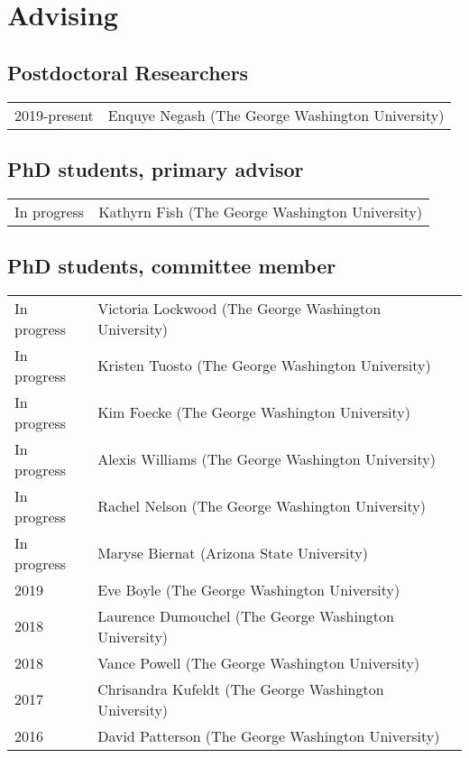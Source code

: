 \documentclass{article}
\begin{document}
\section*{Advising}
\subsection*{Postdoctoral Researchers}
\begin{tabular}{p{}p{}}
2019-present & Enquye Negash (The George Washington University)\\[4pt]
\end{tabular}

\subsection*{PhD students, primary advisor}
\begin{tabular}{p{}p{}}
In progress & Kathyrn Fish (The George Washington University)\\[4pt] %
\end{tabular}

\subsection*{PhD students, committee member}
\begin{tabular}{p{}p{}}
In progress & Victoria Lockwood (The George Washington University)\\[4pt]
In progress & Kristen Tuosto (The George Washington University)\\[4pt]
In progress & Kim Foecke (The George Washington University)\\[4pt]
In progress & Alexis Williams (The George Washington University)\\[4pt]
In progress & Rachel Nelson (The George Washington University)\\[4pt]
In progress & Maryse Biernat (Arizona State University)\\[4pt]
2019 & Eve Boyle (The George Washington University)\\[4pt]
2018 & Laurence Dumouchel (The George Washington University)\\[4pt]
2018 & Vance Powell (The George Washington University)\\[4pt]
2017 & Chrisandra Kufeldt (The George Washington University)\\[4pt]
2016 & David Patterson (The George Washington University)\\

\end{tabular}
\end{document}
